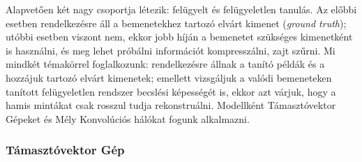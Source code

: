 Alapvetően két nagy csoportja létezik: felügyelt és felügyeletlen tanulás.
Az előbbi esetben rendelkezésre áll a bemenetekhez tartozó elvárt kimenet (\textit{ground truth}); utóbbi esetben viszont nem, ekkor jobb híján a bemenetet szükséges kimenetként is használni, és meg lehet próbálni információt kompresszálni, zajt szűrni.  %
Mi mindkét témakörrel foglalkozunk: rendelkezésre állnak a tanító példák és a hozzájuk
tartozó elvárt kimenetek; emellett vizsgáljuk a valódi bemeneteken tanított felügyeletlen rendszer becslési képességét is, ekkor azt várjuk, hogy a hamis mintákat csak rosszul tudja rekonstruálni. Modellként Támasztóvektor Gépeket és Mély Konvolúciós hálókat
fogunk alkalmazni.


\subsubsection{Támasztóvektor Gép}
\label{sec:svm}

